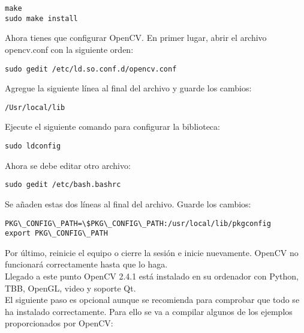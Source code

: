 \begin{lstlisting}[style=consola]
make
sudo make install
\end{lstlisting}

Ahora tienes que configurar OpenCV. En primer lugar, abrir el archivo opencv.conf con la siguiente orden:\\

\begin{lstlisting}[style=consola]
sudo gedit /etc/ld.so.conf.d/opencv.conf
\end{lstlisting}

Agregue la siguiente línea al final del archivo y guarde los cambios:\\

\begin{lstlisting}[style=consola]
/Usr/local/lib
\end{lstlisting}

Ejecute el siguiente comando para configurar la biblioteca:\\

\begin{lstlisting}[style=consola]
sudo ldconfig
\end{lstlisting}

Ahora se debe editar otro archivo:\\

\begin{lstlisting}[style=consola]
sudo gedit /etc/bash.bashrc
\end{lstlisting}

Se añaden estas dos líneas al final del archivo. Guarde los cambios:\\

\begin{lstlisting}[style=consola]
PKG\_CONFIG\_PATH=\$PKG\_CONFIG\_PATH:/usr/local/lib/pkgconfig
export PKG\_CONFIG\_PATH
\end{lstlisting}

Por último, reinicie el equipo o cierre la sesión e inicie nuevamente. OpenCV no funcionará correctamente hasta que lo haga.\\

Llegado a este punto OpenCV 2.4.1 está instalado en su ordenador con Python, TBB, OpenGL, video y soporte Qt.\\

El siguiente paso es opcional aunque se recomienda para comprobar que todo se ha instalado correctamente. Para ello se va a compilar algunos de los ejemplos proporcionados por OpenCV:\\

